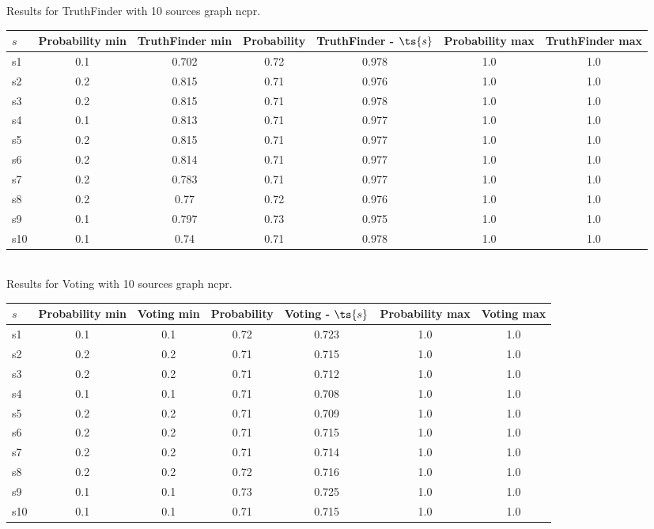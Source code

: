 \documentclass{article}
\begin{document}
\noindent Results for TruthFinder with 10 sources graph ncpr.

\noindent\begin{tabular}{|l|c|c|c|c|c|c|}
\hline
$s$& Probability min & TruthFinder min & Probability & TruthFinder - $\ts{s}$ & Probability max & TruthFinder max\\
\hline
s1 &0.1 & 0.702 & 0.72 & 0.978 & 1.0 & 1.0\\
\hline
s2 &0.2 & 0.815 & 0.71 & 0.976 & 1.0 & 1.0\\
\hline
s3 &0.2 & 0.815 & 0.71 & 0.978 & 1.0 & 1.0\\
\hline
s4 &0.1 & 0.813 & 0.71 & 0.977 & 1.0 & 1.0\\
\hline
s5 &0.2 & 0.815 & 0.71 & 0.977 & 1.0 & 1.0\\
\hline
s6 &0.2 & 0.814 & 0.71 & 0.977 & 1.0 & 1.0\\
\hline
s7 &0.2 & 0.783 & 0.71 & 0.977 & 1.0 & 1.0\\
\hline
s8 &0.2 & 0.77 & 0.72 & 0.976 & 1.0 & 1.0\\
\hline
s9 &0.1 & 0.797 & 0.73 & 0.975 & 1.0 & 1.0\\
\hline
s10 &0.1 & 0.74 & 0.71 & 0.978 & 1.0 & 1.0\\
\hline
\end{tabular}\\

\noindent Results for Voting with 10 sources graph ncpr.

\noindent\begin{tabular}{|l|c|c|c|c|c|c|}
\hline
$s$& Probability min & Voting min & Probability & Voting - $\ts{s}$ & Probability max & Voting max\\
\hline
s1 &0.1 & 0.1 & 0.72 & 0.723 & 1.0 & 1.0\\
\hline
s2 &0.2 & 0.2 & 0.71 & 0.715 & 1.0 & 1.0\\
\hline
s3 &0.2 & 0.2 & 0.71 & 0.712 & 1.0 & 1.0\\
\hline
s4 &0.1 & 0.1 & 0.71 & 0.708 & 1.0 & 1.0\\
\hline
s5 &0.2 & 0.2 & 0.71 & 0.709 & 1.0 & 1.0\\
\hline
s6 &0.2 & 0.2 & 0.71 & 0.715 & 1.0 & 1.0\\
\hline
s7 &0.2 & 0.2 & 0.71 & 0.714 & 1.0 & 1.0\\
\hline
s8 &0.2 & 0.2 & 0.72 & 0.716 & 1.0 & 1.0\\
\hline
s9 &0.1 & 0.1 & 0.73 & 0.725 & 1.0 & 1.0\\
\hline
s10 &0.1 & 0.1 & 0.71 & 0.715 & 1.0 & 1.0\\
\hline
\end{tabular}\\
\end{document}
